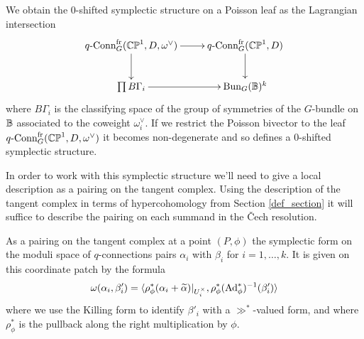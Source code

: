 \documentclass[10pt, oneside]{article}
\newcommand{\qconn}{q\text{-Conn}}
\newcommand{\fr}{\mathrm{fr}}
\newcommand{\Ad}{\mr{Ad}}
\begin{document}
\begin{construction}
We obtain the 0-shifted symplectic structure on a Poisson leaf as the Lagrangian intersection
\[\xymatrix{
\qconn_G^{\fr}(\bb{CP}^1, D, \omega^\vee) \ar[r] \ar[d] &\qconn_G^{\fr}(\bb{CP}^1, D) \ar[d] \\
\prod B\Gamma_i \ar[r] & \bun_G(\bb B)^k
}\]
where $B\Gamma_i$ is the classifying space of the group of symmetries of the $G$-bundle on $\mathbb{B}$ associated to the coweight $\omega^\vee_i$.  If we restrict the Poisson bivector to the leaf $\qconn_G^{\fr}(\bb{CP}^1, D, \omega^\vee)$ it becomes non-degenerate and so defines a 0-shifted symplectic structure.
\end{construction}

In order to work with this symplectic structure we'll need to give a local description as a pairing on the tangent complex.  Using the description of the tangent complex in terms of hypercohomology from Section \ref{def_section} it will suffice to describe the pairing on each summand in the \v Cech resolution.

\begin{lemma}
As a pairing on the tangent complex at a point $(P,\phi)$ the symplectic form on the moduli space of $q$-connections pairs $\alpha_i$ with $\beta_i$ for $i=1,\ldots,k$.  It is given on this coordinate patch by the formula 
\[\omega(\alpha_i, \beta_i') = \langle \rho_\phi^*(\alpha_i + \wt \alpha)|_{U^\times_i}, \rho_\phi^*(\Ad_\phi^*)^{-1}(\beta'_i) \rangle\]
where we use the Killing form to identify $\beta'_i$ with a $\gg^*$-valued form, and where $\rho_\phi^*$ is the pullback along the right multiplication by $\phi$.
\end{lemma}
\end{document}
